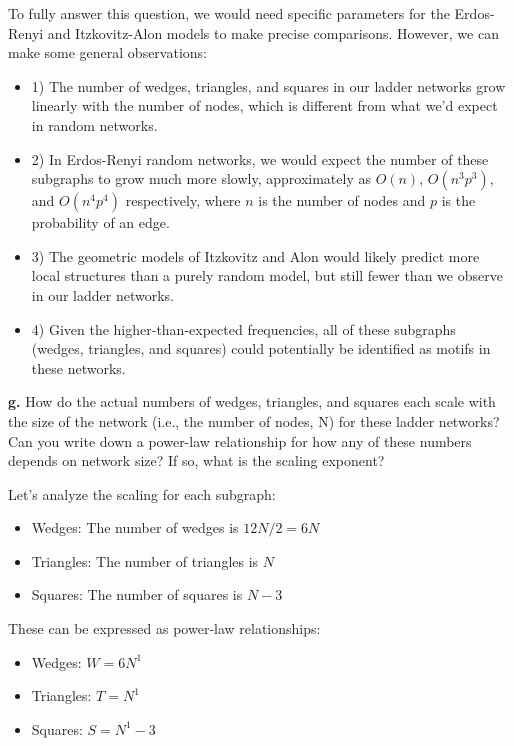 \documentclass{article}
\begin{document}
To fully answer this question, we would need specific parameters for the Erdos-Renyi and Itzkovitz-Alon models to make precise comparisons. However, we can make some general observations:

\begin{itemize}
    \item 1) The number of wedges, triangles, and squares in our ladder networks grow linearly with the number of nodes, which is different from what we'd expect in random networks.
    \item 2) In Erdos-Renyi random networks, we would expect the number of these subgraphs to grow much more slowly, approximately as $O(n)$, $O(n^3p^3)$, and $O(n^4p^4)$ respectively, where $n$ is the number of nodes and $p$ is the probability of an edge.
    \item 3) The geometric models of Itzkovitz and Alon would likely predict more local structures than a purely random model, but still fewer than we observe in our ladder networks.
    \item 4) Given the higher-than-expected frequencies, all of these subgraphs (wedges, triangles, and squares) could potentially be identified as motifs in these networks.
\end{itemize}

\textbf{g.} How do the actual numbers of wedges, triangles, and squares each scale with the size of the network (i.e., the number of nodes, N) for these ladder networks? Can you write down a power-law relationship for how any of these numbers depends on network size? If so, what is the scaling exponent?

Let's analyze the scaling for each subgraph:

\begin{itemize}
    \item Wedges: The number of wedges is $12N/2 = 6N$
    \item Triangles: The number of triangles is $N$
    \item Squares: The number of squares is $N-3$
\end{itemize}

These can be expressed as power-law relationships:

\begin{itemize}
    \item Wedges: $W = 6N^1$
    \item Triangles: $T = N^1$
    \item Squares: $S = N^1 - 3$
\end{itemize}
\end{document}
